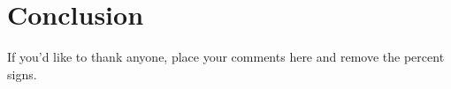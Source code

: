 \section{Conclusion}\label{sec:conclusions}




\begin{acknowledgements}
If you'd like to thank anyone, place your comments here
and remove the percent signs.
\end{acknowledgements}





